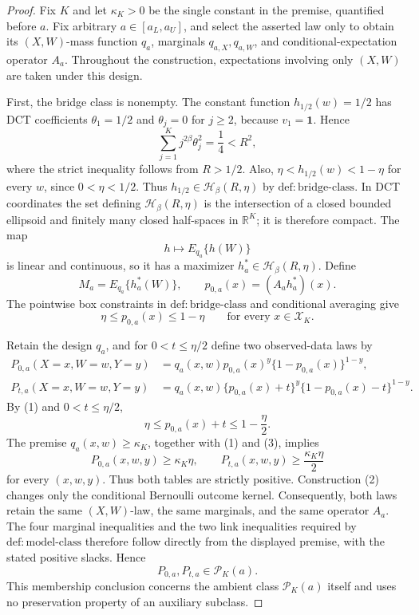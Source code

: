 \documentclass{article}
\begin{document}
\begin{proof}
Fix \(K\) and let \(\kappa_K>0\) be the single constant in the premise, quantified before \(a\). Fix arbitrary \(a\in[a_L,a_U]\), and select the asserted law only to obtain its \((X,W)\)-mass function \(q_a\), marginals \(q_{a,X},q_{a,W}\), and conditional-expectation operator \(A_a\). Throughout the construction, expectations involving only \((X,W)\) are taken under this design.

First, the bridge class is nonempty. The constant function \(h_{1/2}(w)=1/2\) has DCT coefficients \(\theta_1=1/2\) and \(\theta_j=0\) for \(j\ge2\), because \(v_1=\mathbf 1\). Hence
\[
\sum_{j=1}^K j^{2\beta}\theta_j^2=\frac14<R^2,
\]
where the strict inequality follows from \(R>1/2\). Also, \(\eta<h_{1/2}(w)<1-\eta\) for every \(w\), since \(0<\eta<1/2\). Thus \(h_{1/2}\in\mathcal H_\beta(R,\eta)\) by \(\mathrm{def:bridge\mbox{-}class}\). In DCT coordinates the set defining \(\mathcal H_\beta(R,\eta)\) is the intersection of a closed bounded ellipsoid and finitely many closed half-spaces in \(\mathbb R^K\); it is therefore compact. The map
\[
h\longmapsto E_{q_a}\{h(W)\}
\]
is linear and continuous, so it has a maximizer \(h_a^*\in\mathcal H_\beta(R,\eta)\). Define
\[
M_a=E_{q_a}\{h_a^*(W)\},
\qquad
p_{0,a}(x)=(A_a h_a^*)(x).
\]
The pointwise box constraints in \(\mathrm{def:bridge\mbox{-}class}\) and conditional averaging give
\[
\eta\le p_{0,a}(x)\le1-\eta
\qquad\text{for every }x\in\mathcal X_K. \tag{1}
\]

Retain the design \(q_a\), and for \(0<t\le\eta/2\) define two observed-data laws by
\[
\begin{aligned}
P_{0,a}(X=x,W=w,Y=y)
&=q_a(x,w)p_{0,a}(x)^y\{1-p_{0,a}(x)\}^{1-y},\\
P_{t,a}(X=x,W=w,Y=y)
&=q_a(x,w)\{p_{0,a}(x)+t\}^y
  \{1-p_{0,a}(x)-t\}^{1-y}.
\end{aligned} \tag{2}
\]
By (1) and \(0<t\le\eta/2\),
\[
\eta\le p_{0,a}(x)+t\le1-\frac\eta2. \tag{3}
\]
The premise \(q_a(x,w)\ge\kappa_K\), together with (1) and (3), implies
\[
P_{0,a}(x,w,y)\ge\kappa_K\eta,
\qquad
P_{t,a}(x,w,y)\ge\frac{\kappa_K\eta}{2} \tag{4}
\]
for every \((x,w,y)\). Thus both tables are strictly positive. Construction (2) changes only the conditional Bernoulli outcome kernel. Consequently, both laws retain the same \((X,W)\)-law, the same marginals, and the same operator \(A_a\). The four marginal inequalities and the two link inequalities required by \(\mathrm{def:model\mbox{-}class}\) therefore follow directly from the displayed premise, with the stated positive slacks. Hence
\[
P_{0,a},P_{t,a}\in\mathcal P_K(a). \tag{5}
\]
This membership conclusion concerns the ambient class \(\mathcal P_K(a)\) itself and uses no preservation property of an auxiliary subclass.


\end{proof}
\end{document}

